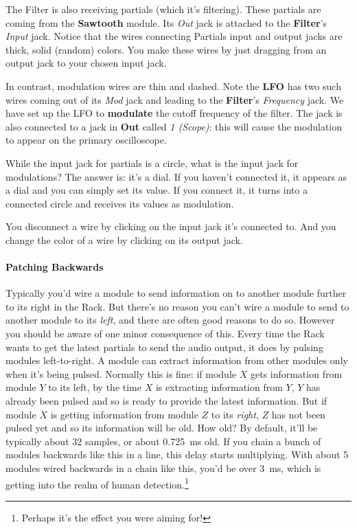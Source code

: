 \documentclass{article}
\begin{document}
The Filter is also receiving partials (which it's filtering).  These partials are coming from the {\bf Sawtooth} module.  Its {\it Out} jack is attached to the {\bf Filter}'s {\it Input} jack.  Notice that the wires connecting Partials input and output jacks are thick, solid (random) colors.  You make these wires by just dragging from an output jack to your chosen input jack.

In contrast, modulation wires are thin and dashed.  Note the {\bf LFO} has two such wires coming out of its {\it Mod} jack and leading to the {\bf Filter}'s {\it Frequency} jack.  We have set up the LFO to {\bf modulate} the cutoff frequency of the filter.
The jack is also connected to a jack in {\bf Out} called {\it 1 (Scope)}: this will cause the modulation to appear on the primary oscilloscope.  

While the input jack for partials is a circle, what is the input jack for modulations?  The answer is: it's a dial.  If you haven't connected it, it appears as a dial and you can simply set its value.  If you connect it, it turns into a connected circle and receives its values as modulation. 

You disconnect a wire by clicking on the input jack it's connected to.  And you change the color of a wire by clicking on its output jack.

\paragraph{Patching Backwards}  Typically you'd wire a module to send information on to another module further to its right in the Rack.  But there's no reason you can't wire a module to send to another module to its {\it left}, and there are often good reasons to do so.  However you should be aware of one minor consequence of this.  Every time the Rack wants to get the latest partials to send the audio output, it does by pulsing modules left-to-right.  A module can extract information from other modules only when it's being pulsed.  Normally this is fine: if module \(X\) gets information from module \(Y\) to its left, by the time \(X\) is extracting information from \(Y\), \(Y\) has already been pulsed and so is ready to provide the latest information.  But if module \(X\) is getting information from module \(Z\) to its {\it right}, \(Z\) has not been pulsed yet and so its information will be old.  How old?  By default, it'll be typically about 32 samples, or about 0.725~ms old.  If you chain a bunch of modules backwards like this in a line, this delay starts multiplying.   With about 5 modules wired backwards in a chain like this, you'd be over 3~ms, which is getting into the realm of human detection.\footnote{Perhaps it's the effect you were aiming for!} 
\end{document}
